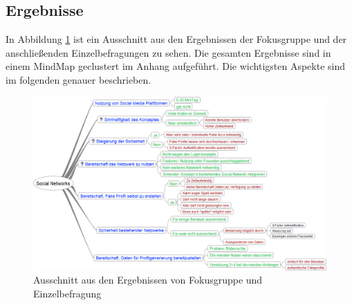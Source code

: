 \documentclass{sigchi}
\begin{document}
\subsection{Ergebnisse}
\label{Ergebnisse}
In Abbildung \ref{fig:MindMap2} ist ein Ausschnitt aus den Ergebnissen der Fokusgruppe und der anschließenden Einzelbefragungen zu sehen. Die gesamten Ergebnisse sind in einem MindMap geclustert im Anhang aufgeführt. Die wichtigsten Aspekte sind im folgenden genauer beschrieben. 
\begin{figure}[htbp]
	\centering
	\includegraphics[width=1.5\columnwidth]{figures/Social-Networks_2.png}
	\caption{Ausschnitt aus den Ergebnissen von Fokusgruppe und Einzelbefragung}
	\label{fig:MindMap2}
\end{figure}
\end{document}
